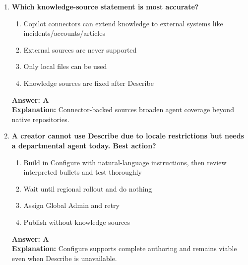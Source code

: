\documentclass[10pt]{article}
\begin{document}
\begin{enumerate}[leftmargin=*]
\item \textbf{Which knowledge-source statement is most accurate?}
\begin{enumerate}[label=\Alph*.]
  \item Copilot connectors can extend knowledge to external systems like incidents/accounts/articles
  \item External sources are never supported
  \item Only local files can be used
  \item Knowledge sources are fixed after Describe
\end{enumerate}
\textbf{Answer: A}\\
\textbf{Explanation:} Connector-backed sources broaden agent coverage beyond native repositories.

\item \textbf{A creator cannot use Describe due to locale restrictions but needs a departmental agent today. Best action?}
\begin{enumerate}[label=\Alph*.]
  \item Build in Configure with natural-language instructions, then review interpreted bullets and test thoroughly
  \item Wait until regional rollout and do nothing
  \item Assign Global Admin and retry
  \item Publish without knowledge sources
\end{enumerate}
\textbf{Answer: A}\\
\textbf{Explanation:} Configure supports complete authoring and remains viable even when Describe is unavailable.

\end{enumerate}


\clearpage
\end{document}

